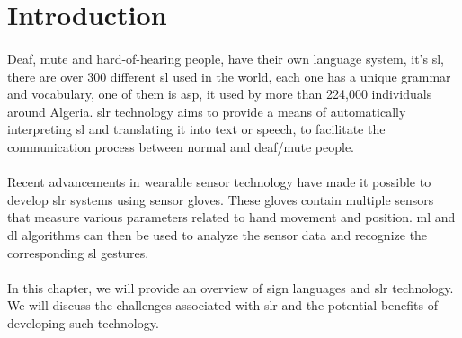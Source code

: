 \section{Introduction}
\paragraph{}
Deaf, mute and hard-of-hearing people, have their own language system, it's \ac{sl}, there are over 300 different \ac{sl} used in the world, each one has a unique grammar and vocabulary, one of them is \ac{asp}, it used by more than 224,000 individuals around Algeria. \ac{slr} technology aims to provide a means of automatically interpreting \ac{sl} and translating it into text or speech, to facilitate the communication process between normal and deaf/mute people.
\paragraph{}
Recent advancements in wearable sensor technology have made it possible to develop \ac{slr} systems using sensor gloves. These gloves contain multiple sensors that measure various parameters related to hand movement and position. \ac{ml} and \ac{dl} algorithms can then be used to analyze the sensor data and recognize the corresponding \ac{sl} gestures.
\paragraph{}
In this chapter, we will provide an overview of sign languages and \ac{slr} technology. We will discuss the challenges associated with \ac{slr} and the potential benefits of developing such technology.